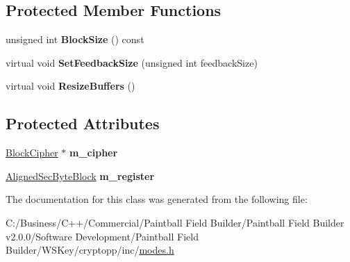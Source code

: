 \subsection*{Protected Member Functions}
\begin{DoxyCompactItemize}
\item 
\hypertarget{class_cipher_mode_base_a35fa9c9e616b0145c1e21745de48a684}{
unsigned int {\bfseries BlockSize} () const }
\label{class_cipher_mode_base_a35fa9c9e616b0145c1e21745de48a684}

\item 
\hypertarget{class_cipher_mode_base_a687cdab140bc5c733bc43299a97c2a17}{
virtual void {\bfseries SetFeedbackSize} (unsigned int feedbackSize)}
\label{class_cipher_mode_base_a687cdab140bc5c733bc43299a97c2a17}

\item 
\hypertarget{class_cipher_mode_base_a8c864c16ce0eb014699c0a61adcc6836}{
virtual void {\bfseries ResizeBuffers} ()}
\label{class_cipher_mode_base_a8c864c16ce0eb014699c0a61adcc6836}

\end{DoxyCompactItemize}
\subsection*{Protected Attributes}
\begin{DoxyCompactItemize}
\item 
\hypertarget{class_cipher_mode_base_ab6c63ae5b5521b462912b1bb2d766989}{
\hyperlink{class_block_cipher}{BlockCipher} $\ast$ {\bfseries m\_\-cipher}}
\label{class_cipher_mode_base_ab6c63ae5b5521b462912b1bb2d766989}

\item 
\hypertarget{class_cipher_mode_base_abec6a6cb74251544b173d639221fe324}{
\hyperlink{class_sec_block}{AlignedSecByteBlock} {\bfseries m\_\-register}}
\label{class_cipher_mode_base_abec6a6cb74251544b173d639221fe324}

\end{DoxyCompactItemize}


The documentation for this class was generated from the following file:\begin{DoxyCompactItemize}
\item 
C:/Business/C++/Commercial/Paintball Field Builder/Paintball Field Builder v2.0.0/Software Development/Paintball Field Builder/WSKey/cryptopp/inc/\hyperlink{modes_8h}{modes.h}\end{DoxyCompactItemize}

